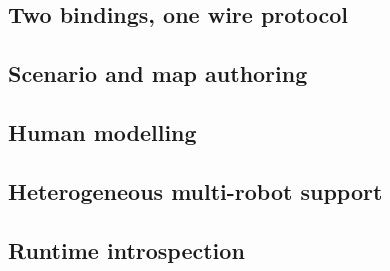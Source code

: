 \documentclass[pdflatex,sn-mathphys-num]{template/sn-jnl}%
\newcommand{\ros}{\textsc{ros}\,2}
\begin{document}
\subsection{Two bindings, one wire protocol}
\label{sec:platform:bindings}

\subsection{Scenario and map authoring}
\label{sec:platform:authoring}

\subsection{Human modelling}
\label{sec:platform:humans}

\subsection{Heterogeneous multi-robot support}
\label{sec:platform:multirobot}

\subsection{Runtime introspection}
\label{sec:platform:introspection}
\end{document}
